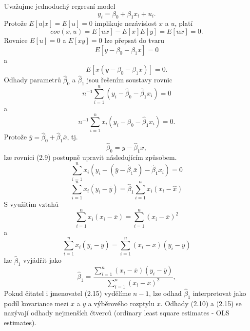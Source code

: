 Uvažujme jednoduchý regresní model
\begin{equation}
y_i = \beta_0 + \beta_1 x_i + u_i.
\end{equation}
Protože $E[u|x] = E[u] = 0$ implikuje nezávislost $x$ a $u$, platí
\begin{equation}
cov(x,u) = E[ux] - E[x]E[y] = E[ux] = 0.
\end{equation}
Rovnice $E[u] = 0$ a $E[xy] = 0$ lze přepsat do tvaru
\begin{equation}
E[y - \beta_0 - \beta_1 x] = 0
\end{equation}
a
\begin{equation}
E[x(y - \beta_0 - \beta_1 x)] = 0.
\end{equation}
Odhady parametrů $\hat{\beta}_0$ a $\hat{\beta}_1$ jsou řešením soustavy rovnic
\begin{equation}
n^{-1} \sum_{i = 1}^n (y_i - \hat{\beta}_0 - \hat{\beta}_1x_i) = 0
\end{equation}
a
\begin{equation}
n^{-1} \sum_{i = 1}^n x_i (y_i - \hat{\beta}_0 - \hat{\beta}_1x_i) = 0.
\end{equation}
Protože $\bar{y} = \hat{\beta}_0 + \hat{\beta}_1 \bar{x}$, tj.
\begin{equation}
\hat{\beta}_0 = \bar{y} - \hat{\beta}_1 \bar{x},
\end{equation}
lze rovnici (2.9) postupně upravit následujícím způsobem.
\begin{equation}
\sum_{i = 1}^n x_i(y_i - (\bar{y} - \hat{\beta}_1 \bar{x}) - \hat{\beta}_1x_i) = 0
\end{equation}
\begin{equation}
\sum_{i = 1}^n x_i(y_i - \bar{y}) = \hat{\beta}_1 \sum_{i = 1}^n x_i(x_i - \hat{x})
\end{equation}
S využitím vztahů
\begin{equation}
\sum_{i = 1}^n x_i (x_i - \bar{x}) = \sum_{i = 1}^n (x_i - \bar{x})^2
\end{equation}
a
\begin{equation}
\sum_{i = 1}^n x_i(y_i - \bar{y}) = \sum_{i = 1}^n (x_i - \bar{x})(y_i - \bar{y})
\end{equation}
lze $\hat{\beta}_1$ vyjádřit jako
\begin{equation}
\hat{\beta}_1 = \frac{\sum_{i = 1}^n (x_i - \bar{x})(y_i - \bar{y})}{\sum_{i = 1}^n (x_i - \bar{x})^2},
\end{equation}
Pokud čitatel i jmenovatel (2.15) vydělíme $n - 1$, lze odhad $\hat{\beta}_1$ interpretovat jako podíl kovariance mezi $x$ a $y$ a výběrového rozptylu $x$. Odhady (2.10) a (2.15) se nazývají odhady nejmenších čtverců 
(ordinary least square estimates - OLS estimates).

